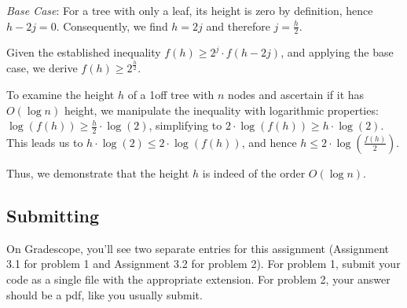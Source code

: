 \documentclass[11pt]{article}
\begin{document}
\begin{enumerate}
\begin{enumerate}
\begin{enumerate}
\emph{Base Case}: For a tree with only a leaf, its height is zero by definition, hence $h - 2j = 0$. Consequently, we find $h = 2j$ and therefore $j = \frac{h}{2}$.

Given the established inequality $f(h) \geq 2^j \cdot f(h - 2j)$, and applying the base case, we derive $f(h) \geq 2^{\frac{h}{2}}$.

To examine the height \(h\) of a 1off tree with \(n\) nodes and ascertain if it has \(O(\log n)\) height, we manipulate the inequality with logarithmic properties: $\log(f(h)) \geq \frac{h}{2} \cdot \log(2)$, simplifying to $2 \cdot \log(f(h)) \geq h \cdot \log(2)$. This leads us to $h \cdot \log(2) \leq 2 \cdot \log(f(h))$, and hence $h \leq 2 \cdot \log\left(\frac{f(h)}{2}\right)$.

Thus, we demonstrate that the height \(h\) is indeed of the order \(O(\log n)\).
\end{enumerate}

\end{enumerate}


\subsection*{Submitting}

On Gradescope, you'll see two separate entries for this assignment (Assignment 3.1 for problem 1 and Assignment 3.2 for problem 2).  For problem 1, submit your code as a single file with the appropriate extension.  For problem 2, your answer should be a pdf, like you usually submit.


\end{enumerate}
\end{document}
